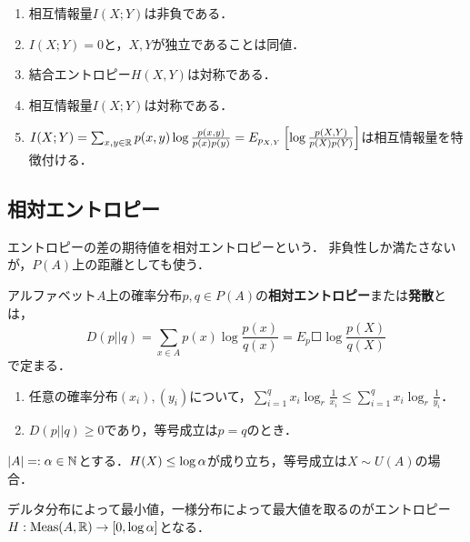 \documentclass[uplatex,dvipdfmx]{jsreport}
\begin{document}
\begin{lemma}\mbox{}
    \begin{enumerate}
        \item 相互情報量$I(X;Y)$は非負である．
        \item $I(X;Y)=0$と，$X,Y$が独立であることは同値．
        \item 結合エントロピー$H(X,Y)$は対称である．
        \item 相互情報量$I(X;Y)$は対称である．
        \item $I(X;Y)=\sum_{x,y\in\mathbb{R}}p(x,y)\log\frac{p(x,y)}{p(x)p(y)}=E_{p_{X,Y}}\left[\log\frac{p(X,Y)}{p(X)p(Y)}\right]$は相互情報量を特徴付ける．
    \end{enumerate}
\end{lemma}

\subsection{相対エントロピー}

\begin{tcolorbox}[colframe=ForestGreen, colback=ForestGreen!10!white,breakable,colbacktitle=ForestGreen!40!white,coltitle=black,fonttitle=\bfseries\sffamily,
title=]
    エントロピーの差の期待値を相対エントロピーという．
    非負性しか満たさないが，$P(A)$上の距離としても使う．
\end{tcolorbox}

\begin{definition}
    アルファベット$A$上の確率分布$p,q\in P(A)$の\textbf{相対エントロピー}または\textbf{発散}とは，
    \[D(p||q)=\sum_{x\in A}p(x)\log\frac{p(x)}{q(x)}=E_p\Square{\log\frac{p(X)}{q(X)}}\]
    で定まる．
\end{definition}

\begin{proposition}[相対エントロピーの非負性]\mbox{}
    \begin{enumerate}
        \item 任意の確率分布$(x_i),(y_i)$について，$\sum^q_{i=1}x_i\log_r\frac{1}{x_i}\le\sum^q_{i=1}x_i\log_r\frac{1}{y_i}$．
        \item $D(p||q)\ge 0$であり，等号成立は$p=q$のとき．
    \end{enumerate}
\end{proposition}

\begin{proposition}[エントロピーの上限]
    $\lvert A\rvert=:\alpha\in\mathbb{N}$とする．$H(X)\le\log\alpha$が成り立ち，等号成立は$X\sim U(A)$の場合．
\end{proposition}
\begin{remarks}
    デルタ分布によって最小値，一様分布によって最大値を取るのがエントロピー$H:\mathrm{Meas}(A,\mathbb{R})\to[0,\log\alpha]$となる．
\end{remarks}
\end{document}
